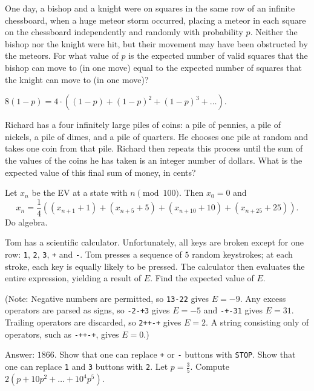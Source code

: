 \documentclass[11pt]{scrartcl}
\begin{document}
\begin{problem}[NIMO 4.3]
  One day, a bishop and a knight were on squares in the same row of an infinite chessboard,
  when a huge meteor storm occurred,
  placing a meteor in each square on the chessboard independently and randomly with probability $p$.
  Neither the bishop nor the knight were hit, but their movement may have been obstructed by the meteors.
  For what value of $p$ is the expected number of valid squares that the bishop
  can move to (in one move) equal to the expected number of squares that the
  knight can move to (in one move)? %
  \begin{sketch}
    $8(1-p) = 4 \cdot \left( (1-p)+(1-p)^2+(1-p)^3+\dots \right)$.
  \end{sketch}
\end{problem}
\begin{problem}[NIMO 7.3]
  Richard has a four infinitely large piles of coins: a pile of pennies, a pile of nickels, a pile of dimes,
  and a pile of quarters. He chooses one pile at random and takes one coin from that pile.
  Richard then repeats this process until the sum of the values of the coins he
  has taken is an integer number of dollars.
  What is the expected value of this final sum of money, in cents? %
  \begin{sketch}
    Let $x_n$ be the EV at a state with $n \pmod{100}$.
    Then $x_0 = 0$ and \[ x_n = \frac 14 \left( (x_{n+1}+1) + (x_{n+5}+5) +
    (x_{n+10}+10) + (x_{n+25}+25) \right). \]
    Do algebra.
  \end{sketch}
\end{problem}
\begin{problem}[NIMO 5.6]
  Tom has a scientific calculator.
  Unfortunately, all keys are broken except for one row: \verb$1$, \verb$2$, \verb$3$, \verb$+$ and \verb$-$.
  Tom presses a sequence of $5$ random keystrokes; at each stroke, each key is equally likely to be pressed.
  The calculator then evaluates the entire expression, yielding a result of $E$.
  Find the expected value of $E$. \par (Note: Negative numbers are permitted, so \verb$13-22$ gives $E = -9$.
  Any excess operators are parsed as signs, so \verb$-2-+3$ gives $E=-5$ and \verb$-+-31$ gives $E = 31$.
  Trailing operators are discarded, so \verb$2++-+$ gives $E=2$.
  A string consisting only of operators, such as \verb$-++-+$, gives $E=0$.) %
  \begin{sketch}
    Answer: $1866$.
    Show that one can replace \verb$+$ or \verb$-$ buttons with \verb$STOP$.
    Show that one can replace \verb$1$ and \verb$3$ buttons with \verb$2$.
    Let $p = \frac 35$.  Compute $2(p + 10p^2 + \dots + 10^4p^5)$.
  \end{sketch}
\end{problem}
\end{document}
